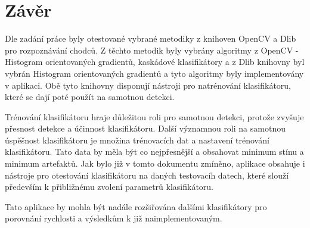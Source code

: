 \section{Závěr}
Dle zadání práce byly otestované vybrané metodiky z knihoven OpenCV a Dlib pro rozpoznávání chodců. Z těchto metodik byly vybrány algoritmy z OpenCV - Histogram orientovaných gradientů, kaskádové klasifikátory a z Dlib knihovny byl vybrán Histogram orientovaných gradientů a tyto algoritmy byly implementovány v aplikaci. Obě tyto knihovny disponují nástroji pro natrénování klasifikátoru, které se dají poté použít na samotnou detekci.

Trénování klasifikátoru hraje důležitou roli pro samotnou detekci, protože zvyšuje přesnost detekce a účinnost klasifikátoru.  Další významnou roli na samotnou úspěšnost klasifikátoru je množina trénovacích dat a nastavení trénování klasifikátoru. Tato data by měla být co nejpřesnější a obsahovat minimum stínu a minimum artefaktů. Jak bylo již v tomto dokumentu zmíněno, aplikace obsahuje i nástroje pro otestování klasifikátoru na daných testovacíh datech, které slouží především k přibližnému zvolení parametrů klasifikátoru.

Tato aplikace by mohla být nadále rozšiřována dalšími klasifikátory pro porovnání rychlosti a výsledkům k již naimplementovaným. 